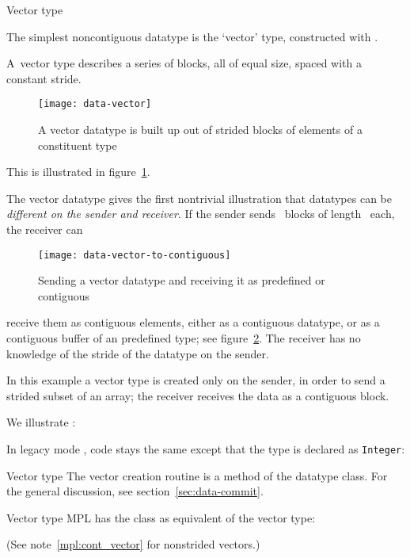  {Vector type}
\label{sec:data:vector}

The simplest noncontiguous datatype is the `vector' type, constructed with
.

A~vector type describes a series of blocks, all 
of equal size, spaced with a constant stride.
\begin{figure}[t]
  \texttt{[image: data-vector]}
  \caption{A vector datatype is built up out of strided blocks of elements of a constituent type}
  \label{fig:data-vector}
\end{figure}
This is illustrated in figure~\ref{fig:data-vector}.

The vector datatype gives the first nontrivial illustration that
datatypes can be \emph{different on the sender and
  receiver}. If the
sender sends ~blocks of length~ each, the receiver can
%
\begin{figure}[t]
  \texttt{[image: data-vector-to-contiguous]}
  \caption{Sending a vector datatype and receiving it as predefined or
    contiguous}
  \label{fig:data-vector-to-contiguous}
\end{figure}
%
receive them as  contiguous elements, either as a contiguous
datatype, or as a contiguous buffer of an predefined type; see
figure~\ref{fig:data-vector-to-contiguous}.
The receiver has no knowledge of the stride of the datatype on the sender.

In this example a vector type is created only on the sender, in order to send
a strided subset of an array; the receiver receives the data as a contiguous block.

We illustrate :
%

In legacy mode , code stays the same except that the type is
declared as \lstinline{Integer}:
%

\begin{pythonnote}{Vector type}
  The vector creation routine is a method of the datatype class.
  For the general discussion, see section~\ref{sec:data-commit}.
\end{pythonnote}


\begin{mplnote}{Vector type}
  \label{mpl:strided_vector}
  MPL has the  class as equivalent
  of the vector type:

  (See note~\ref{mpl:cont_vector} for nonstrided vectors.)
\end{mplnote}

